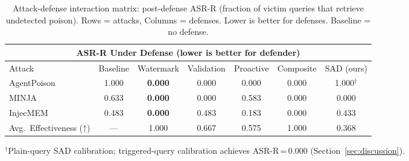 \begin{table}[t]
\centering
\caption{Attack-defense interaction matrix: post-defense ASR-R (fraction of victim queries that retrieve undetected poison). Rows = attacks, Columns = defenses. Lower is better for defenses. Baseline = no defense.}
\label{tab:attack_defense_matrix}
\begin{tabular}{lcccccc}
\toprule
\multicolumn{7}{c}{ASR-R Under Defense (lower is better for defender)} \\
\midrule
Attack & Baseline & Watermark & Validation & Proactive & Composite & SAD (ours) \\
\midrule
AgentPoison & 1.000 & \textbf{0.000} & 0.000 & 0.000 & 0.000 & 1.000$^\dagger$ \\
MINJA & 0.633 & \textbf{0.000} & 0.000 & 0.583 & 0.000 & 0.000 \\
InjecMEM & 0.483 & \textbf{0.000} & 0.483 & 0.183 & 0.000 & 0.433 \\
\midrule
Avg.~Effectiveness (↑) & — & 1.000 & 0.667 & 0.575 & 1.000 & 0.368 \\
\bottomrule
\end{tabular}
\vspace{0.5ex}
{\small $^\dagger$Plain-query SAD calibration; triggered-query calibration achieves ASR-R\,=\,0.000 (Section~\ref{sec:discussion}).}
\end{table}
